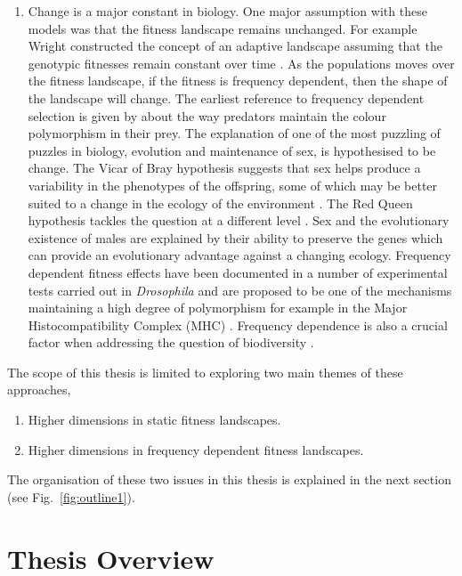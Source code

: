 \documentclass[oneside,11pt,a4paper]{book}
\begin{document}
\begin{enumerate}[\textbf{--}]
\item Change is a major constant in biology.
One major assumption with these models was that the fitness landscape remains unchanged.
For example Wright constructed the concept of an adaptive landscape assuming that the genotypic fitnesses remain constant over time \citep{provine:1986bo}.
As the populations moves over the fitness landscape, if the fitness is frequency dependent, then the shape of the landscape will change.
The earliest reference to frequency dependent selection is given by \citet{poulton:1884aa} about the way predators maintain the colour polymorphism in their prey.
The explanation of one of the most puzzling of puzzles in biology, evolution and maintenance of sex, is hypothesised to be change.
The Vicar of Bray hypothesis suggests that sex helps produce a variability in the phenotypes of the offspring, some of which may be better suited to a change in the ecology of the environment \citep{ridley:2003bo}.
The Red Queen hypothesis tackles the question at a different level \citep{vanVaalen:1973aa}.
Sex and the evolutionary existence of males are explained by their ability to preserve the genes which can provide an evolutionary advantage against a changing ecology.
Frequency dependent fitness effects have been documented in a number of experimental tests carried out in \textit{Drosophila} \citep{ayala:1974aa,hartl:1997bo} and are proposed to be one of the mechanisms maintaining a high degree of polymorphism for example in the Major Histocompatibility Complex (MHC) \citep{borghans:2004oe,milinski:2006mh}.
Frequency dependence is also a crucial factor when addressing the question of biodiversity \citep{levin:2000aa}.
\end{enumerate}

The scope of this thesis is limited to exploring two main themes of these approaches,
\begin{enumerate}[\textbf{--}]
\item Higher dimensions in static fitness landscapes.
\item Higher dimensions in frequency dependent fitness landscapes.
\end{enumerate}

The organisation of these two issues in this thesis is explained in the next section (see Fig.\ \ref{fig:outline1}).

\section{Thesis Overview}
\end{document}
